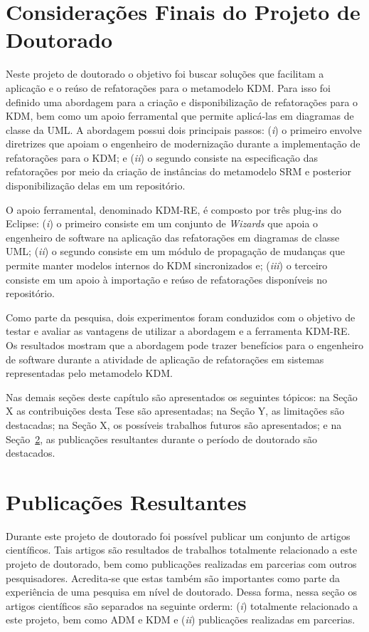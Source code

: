\section{Considerações Finais do Projeto de Doutorado}

Neste projeto de doutorado o objetivo foi buscar soluções que facilitam a aplicação e o reúso de refatorações para o metamodelo KDM. Para isso foi definido uma abordagem para a criação e disponibilização de refatorações para o KDM, bem como um apoio ferramental que permite aplicá-las em diagramas de classe da UML. A abordagem possui dois principais passos: (\textit{i}) o primeiro envolve diretrizes que apoiam o engenheiro de modernização durante a implementação de refatorações para o KDM; e (\textit{ii}) o segundo consiste na especificação das refatorações por meio da criação de instâncias do metamodelo SRM e posterior disponibilização delas em um repositório.

O apoio ferramental, denominado KDM-RE, é composto por três plug-ins do Eclipse: (\textit{i}) o primeiro consiste em um conjunto de \textit{Wizards} que apoia o engenheiro de software na aplicação das refatorações em diagramas de classe UML; (\textit{ii}) o segundo consiste em um módulo de propagação de mudanças que permite manter modelos internos do KDM sincronizados e; (\textit{iii}) o terceiro consiste em um apoio à importação e reúso de refatorações disponíveis no repositório.

Como parte da pesquisa, dois experimentos foram conduzidos com o objetivo de testar e avaliar as vantagens de utilizar a abordagem e a ferramenta KDM-RE. Os resultados mostram que a abordagem pode trazer benefícios para o engenheiro de software durante a atividade de aplicação de refatorações em sistemas representadas pelo metamodelo KDM.

Nas demais seções deste capítulo são apresentados os seguintes tópicos: na Seção X as contribuições desta Tese são apresentadas; na Seção Y, as limitações são destacadas; na Seção X, os possíveis trabalhos futuros são apresentados; e na Seção~\ref{sec:publicacoes_resultantes}, as publicações resultantes durante o período de doutorado são destacados. 

\section{Publicações Resultantes}\label{sec:publicacoes_resultantes}
Durante este projeto de doutorado foi possível publicar um conjunto de artigos científicos. Tais artigos são resultados de trabalhos totalmente relacionado a este projeto de doutorado, bem como publicações realizadas em parcerias com outros pesquisadores. Acredita-se que estas também são importantes como parte da experiência de uma pesquisa em nível de doutorado. Dessa forma, nessa seção os artigos científicos são separados na seguinte orderm: (\textit{i}) totalmente relacionado a este projeto, bem como ADM e KDM e (\textit{ii}) publicações realizadas em parcerias.

